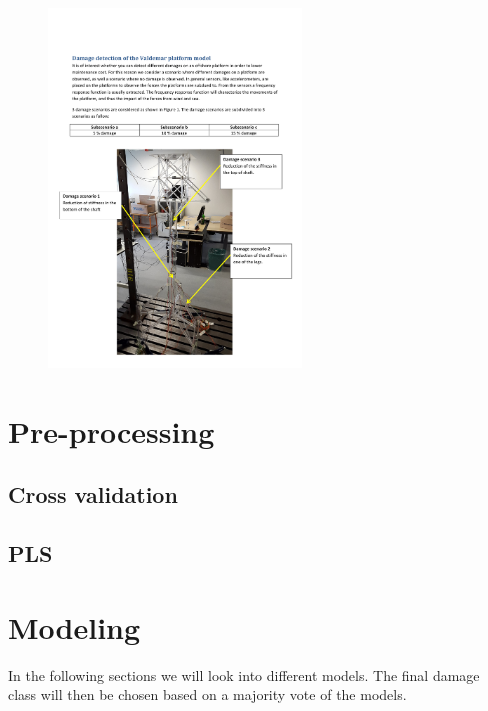 \documentclass[a4paper,draft=false]{scrreprt}\usepackage[]{graphicx}\usepackage[]{color}
\begin{document}
\begin{figure}[hb]
\begin{center}
\includegraphics[width=0.6\textwidth]{Valdemarplatform}
\end{center}
\end{figure}

\chapter{Pre-processing}
\section{Cross validation} %
\section{PLS} %

\chapter{Modeling}


In the following sections we will look into different models. The final damage class will then be chosen based on a majority vote of the models.
\end{document}
